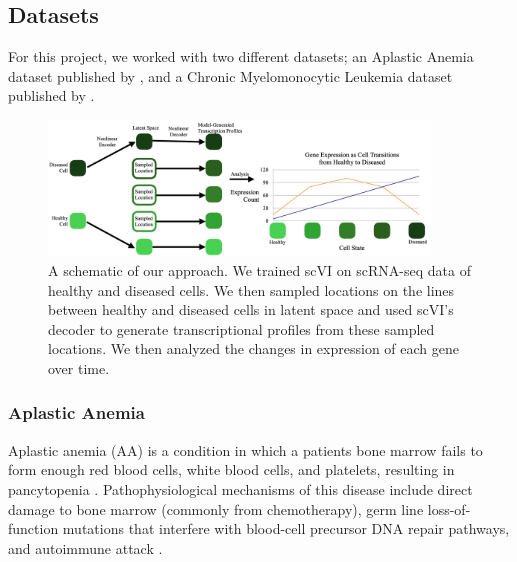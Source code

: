 \documentclass{article}
\begin{document}
\subsection{Datasets}
For this project, we worked with two different datasets; an Aplastic Anemia dataset published by \citet{tonglin_single-cell_2022}, and a Chronic Myelomonocytic Leukemia dataset published by \citet{ferrall-fairbanks_progenitor_2022}.

\begin{figure}
  \centering
  \includegraphics[width=0.9\textwidth]{cropped_approach.jpg}
  \caption{A schematic of our approach. 
  We trained scVI on scRNA-seq data of healthy and diseased cells.
  We then sampled locations on the lines between healthy and diseased cells in latent space and used scVI's decoder to generate transcriptional profiles from these sampled locations.
  We then analyzed the changes in expression of each gene over time.}
  \label{approach}
\end{figure}

\subsubsection{Aplastic Anemia}
Aplastic anemia (AA) is a condition in which a patient\textquotesingle s bone marrow fails to form enough red blood cells, white blood cells, and platelets, resulting in pancytopenia \citep{young_aplastic_2018}.
Pathophysiological mechanisms of this disease include direct damage to bone marrow (commonly from chemotherapy), germ line loss-of-function mutations that interfere with blood-cell precursor DNA repair pathways, and autoimmune attack \citep{young_aplastic_2018}. 
\end{document}
